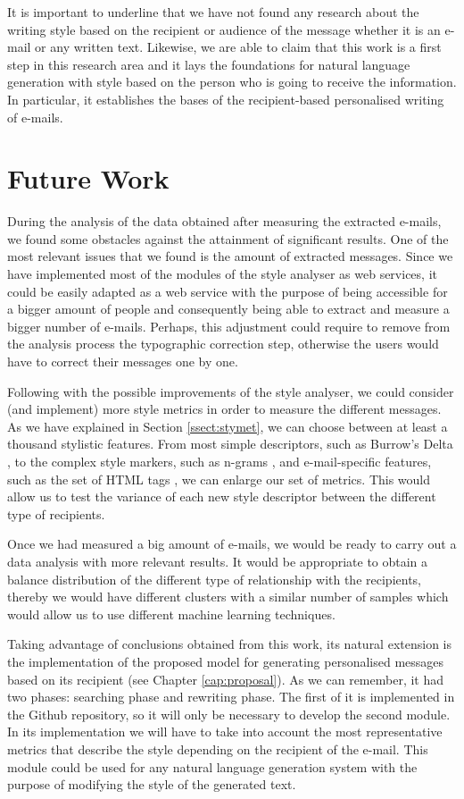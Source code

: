 It is important to underline that we have not found any research about the writing style based on the recipient or audience of the message whether it is an e-mail or any written text. Likewise, we are able to claim that this work is a first step in this research area and it lays the foundations for natural language generation with style based on the person who is going to receive the information. In particular, it establishes the bases of the recipient-based personalised writing of e-mails.

\section{Future Work}\label{sect:future}
During the analysis of the data obtained after measuring the extracted e-mails, we found some obstacles against the attainment of significant results. One of the most relevant issues that we found is the amount of extracted messages. Since we have implemented most of the modules of the style analyser as web services, it could be easily adapted as a web service with the purpose of being accessible for a bigger amount of people and consequently being able to extract and measure a bigger number of e-mails. Perhaps, this adjustment could require to remove from the analysis process the typographic correction step, otherwise the users would have to correct their messages one by one.

Following with the possible improvements of the style analyser, we could consider (and implement) more style metrics in order to measure the different messages. As we have explained in Section \ref{ssect:stymet}, we can choose between at least a thousand stylistic features. From most simple descriptors, such as Burrow's Delta \citep{burrows2002delta}, to the complex style markers, such as n-grams \citep{brocardo2013authorship}, and e-mail-specific features, such as the set of HTML tags \citep{de2001mining}, we can enlarge our set of metrics. This would allow us to test the variance of each new style descriptor between the different type of recipients.

Once we had measured a big amount of e-mails, we would be ready to carry out a data analysis with more relevant results. It would be appropriate to obtain a balance distribution of the different type of relationship with the recipients, thereby we would have different clusters with a similar number of samples which would allow us to use different machine learning techniques.

Taking advantage of conclusions obtained from this work, its natural extension is the implementation of the proposed model for generating personalised messages based on its recipient (see Chapter \ref{cap:proposal}). As we can remember, it had two phases: searching phase and rewriting phase. The first of it is implemented in the Github repository, so it will only be necessary to develop the second module. In its implementation we will have to take into account the most representative metrics that describe the style depending on the recipient of the e-mail. This module could be used for any natural language generation system with the purpose of modifying the style of the generated text.